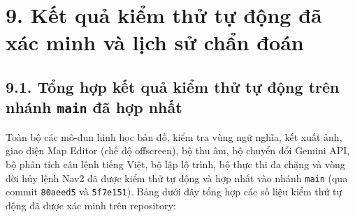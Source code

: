\section*{9. Kết quả kiểm thử tự động đã xác minh và lịch sử chẩn đoán}

\subsection*{9.1. Tổng hợp kết quả kiểm thử tự động trên nhánh \texttt{main} đã hợp nhất}

Toàn bộ các mô-đun hình học bản đồ, kiểm tra vùng ngữ nghĩa, kết xuất ảnh, giao diện Map Editor (chế độ offscreen), bộ thu âm, bộ chuyển đổi Gemini API, bộ phân tích câu lệnh tiếng Việt, bộ lập lộ trình, bộ thực thi đa chặng và vòng đời hủy lệnh Nav2 đã được kiểm thử tự động và hợp nhất vào nhánh \texttt{main} (qua commit \texttt{80aeed5} và \texttt{5f7e151}). Bảng dưới đây tổng hợp các số liệu kiểm thử tự động đã được xác minh trên repository:

